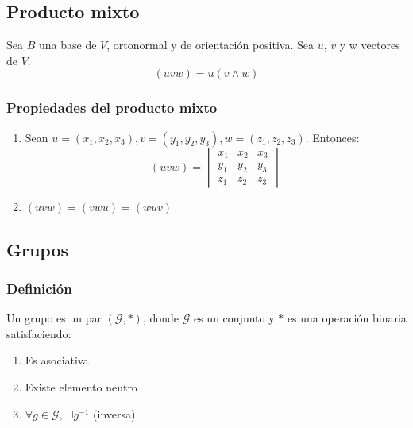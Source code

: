 \documentclass[12pt, a4paper, ones, notitlepage, openany,titlepage]{article}
\begin{document}
\subsection{Producto mixto}
Sea $B$ una base de $V$, ortonormal y de orientación positiva. Sea $u$, $v$ y w vectores de $V$.
$$
(uvw) = u(v \wedge w)
$$

\subsubsection{Propiedades del producto mixto}
\begin{enumerate}
	\item Sean $u = (x_1, x_2, x_3), v = (y_1, y_2, y_3), w = (z_1, z_2, z_3)$. Entonces:\\
	$$
	(uvw) =
	\begin{vmatrix}
		x_1 & x_2 & x_3 \\
		y_1 & y_2 & y_3 \\
		z_1 & z_2 & z_3
	\end{vmatrix}
	$$
	\item $(uvw) = (vwu) = (wuv)$
\end{enumerate}

\subsection{Grupos}

\subsubsection{Definición}
Un grupo es un par $(\mathcal{G}, *)$, donde $\mathcal{G}$ es un conjunto y $*$ es una operación binaria satisfaciendo:
\begin{enumerate}
	\item Es asociativa
	\item Existe elemento neutro
	\item $\forall g \in \mathcal{G}, \; \exists g^{-1}$ (inversa)
\end{enumerate}
\end{document}
